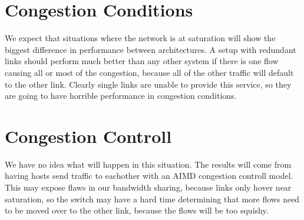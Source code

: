 \documentclass{article}
\begin{document}
\section{Congestion Conditions}
We expect that situations where the network is at saturation will show the biggest difference in performance between architectures. A setup with redundant links should perform much better than any other system if there is one flow causing all or most of the congestion, because all of the other traffic will default to the other link. Clearly single links are unable to provide this service, so they are going to have horrible performance in congestion conditions.
\section{Congestion Controll}
We have no idea what will happen in this situation.
The results will come from having hosts send traffic to eachother with an AIMD congestion controll model.
This may expose flaws in our bandwidth sharing, because links only hover near saturation, so the switch may have a hard time determining that more flows need to be moved over to the other link, because the flows will be too squishy.
\end{document}
